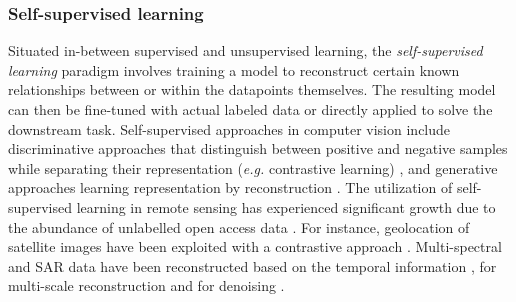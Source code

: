 \documentclass{CUP-JNL-DTM}%
\theoremstyle{definition}
\numberwithin{equation}{section}
\begin{document}
\subsubsection{Self-supervised learning}
\label{sec:ml_ssl}
Situated in-between supervised and unsupervised learning, the \emph{self-supervised learning} paradigm involves training a model to reconstruct certain known relationships between or within the datapoints themselves. The resulting model can then be fine-tuned with actual labeled data or directly applied to solve the downstream task.
%
%
Self-supervised approaches in computer vision include discriminative approaches that distinguish between positive and negative samples while separating their  representation (\textit{e.g.} contrastive learning) \cite{gidaris_unsupervised_2018, he_momentum_2020, chen_simple_2020, caron_emerging_2021, oquab_dinov2_2023}, and generative approaches learning representation by reconstruction \cite{lehtinen_noise2noise_2018, he_masked_2022}.
%
The utilization of self-supervised learning in remote sensing has experienced significant growth due to the abundance of unlabelled open access data \cite{tao_self-supervised_2023}.
For instance, geolocation of satellite images have been exploited with a contrastive approach \cite{mai_csp_2023,ayush_geography-aware_2021}. 
%
Multi-spectral and SAR data have been reconstructed based on the temporal information \cite{cong_satmae_2022, yadav_unsupervised_2022}, for multi-scale reconstruction \cite{reed_scale-mae_2022} and for denoising \cite{dalsasso_sar2sar_2021, dalsasso_as_2022, meraoumia_multitemporal_2023}.
\end{document}
